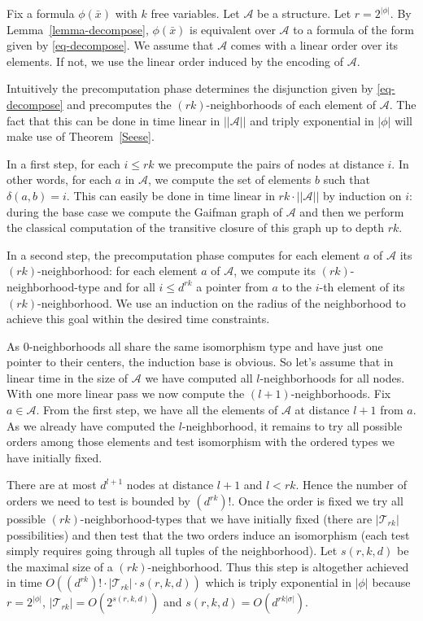 \documentclass{LMCS}
\newcommand\cA{\ensuremath{{\mathcal A}}\xspace}
\newcommand{\T}{\ensuremath{{\mathcal T}}}
\begin{document}
 Fix a formula $\phi(\bar x)$ with
$k$ free variables. Let \cA be a structure. Let $r=2^{|\phi|}$. By
Lemma~\ref{lemma-decompose}, $\phi(\bar x)$ is equivalent over \cA to a formula
of the form given by \eqref{eq-decompose}.  We assume that \cA comes with a
linear order over its elements. If not, we use the linear order induced by the
encoding of \cA.

  Intuitively the precomputation phase determines the disjunction given by
  \eqref{eq-decompose} and precomputes the
  $(rk)$-neighborhoods of each element of $\cA$. The fact that this can be done
  in time linear in $||\cA||$ and triply exponential in $|\phi|$ will make use
  of Theorem~\ref{Seese}.

  In a first step, for each $i\leq rk$ we precompute the pairs of nodes at
  distance $i$. In other words, for each $a$ in \cA, we compute the set of
  elements $b$ such that $\delta(a,b)=i$. This can easily be done in time
  linear in $rk\cdot||\cA||$ by induction on $i$: during the base case we compute
  the Gaifman graph of \cA and then we perform the classical computation of
  the transitive closure of this graph up to depth $rk$.

  In a second step, the precomputation phase computes for each element $a$ of
  $\cA$ its $(rk)$-neighborhood: for each element $a$ of \cA, we compute its
  $(rk)$-neighborhood-type and for all $i\leq d^{rk}$ a pointer from $a$ to the $i$-th
  element of its $(rk)$-neighborhood. We use an induction on the radius of the
  neighborhood to achieve this goal within the desired time constraints.
  
  As $0$-neighborhoods all share the same isomorphism type and have just one
  pointer to their centers, the induction base is obvious. So let's assume that
  in linear time in the size of $\cA$ we have computed all $l$-neighborhoods
  for all nodes.  With one more linear pass we now compute the
  $(l+1)$-neighborhoods. Fix $a \in \cA$. From the first step, we have all
  the elements of \cA at distance $l+1$ from $a$. As we already have computed
  the $l$-neighborhood, it remains to try all possible orders among those
  elements and test isomorphism with the ordered types we have initially fixed.

  There are at most $d^{l+1}$ nodes at distance $l+1$ and $l< rk$. Hence the
  number of orders we need to test is bounded by $(d^{rk})!$. Once the order is
  fixed we try all possible $(rk)$-neighborhood-types that we have initially
  fixed (there are $|\T_{rk}|$ possibilities) and then test that the two orders
  induce an isomorphism (each test simply requires going through all tuples of
  the neighborhood). Let $s(r,k,d)$ be the maximal size of a
  $(rk)$-neighborhood. Thus this step is altogether achieved in time
  $O((d^{rk})! \cdot |\T_{rk}| \cdot s(r,k,d))$ which is triply exponential in $|\phi|$
  because $r=2^{|\phi|}$, $|\T_{rk}|=O(2^{s(r,k,d)})$ and $s(r,k,d)=O(d^{rk|\sigma|})$.
\end{document}
